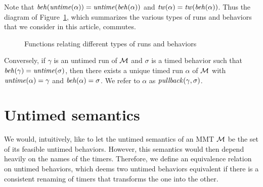 Note that $\mathit{beh}(\mathit{untime}(\alpha))=\mathit{untime}(\mathit{beh}(\alpha))$ and $\mathit{tw}(\alpha) = \mathit{tw}(\mathit{beh}(\alpha))$.
\iflong
Thus the diagram of Figure~\ref{fig:diagram}, which summarizes the various types of runs and behaviors that we consider
in this article, commutes.
\begin{figure}[h]
\centering
{}
\caption{Functions relating different types of runs and behaviors}
\label{fig:diagram}
\end{figure}
\fi
Conversely, if $\gamma$ is an untimed run  of ${\cal M}$ and $\sigma$ is a timed behavior such that $\mathit{beh}(\gamma) = \mathit{untime}(\sigma)$,
then there exists a unique timed run $\alpha$ of ${\cal M}$ with $\mathit{untime}(\alpha) = \gamma$ and $\mathit{beh}(\alpha) = \sigma$.
We refer to $\alpha$ as $\mathit{pullback}(\gamma,\sigma)$.

\section{Untimed semantics}
\label{section untimed semantics}
We would, intuitively, like to let the untimed semantics of an MMT ${\cal M}$ be the set of its feasible untimed behaviors.
However, this semantics would then depend heavily on the names of the timers. Therefore, we define an equivalence relation
on untimed behaviors, which deems two untimed behaviors equivalent if there is a consistent renaming of timers that transforms
the one into the other.

